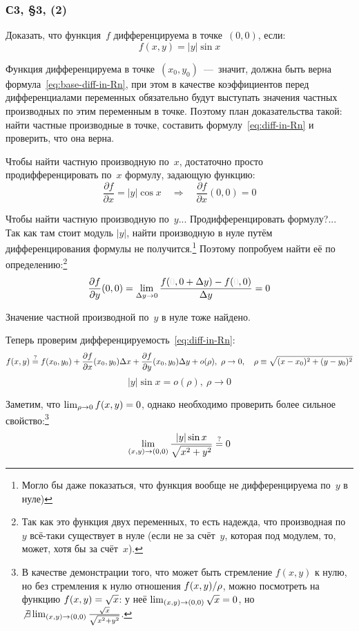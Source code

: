\documentclass[a4paper,12pt]{article}
\begin{document}
  \subsubsection{С3, \S 3, (2)}

  Доказать, что функция~$f$ дифференцируема в точке~$(0, 0)$, если:
  \[
    f(x, y) = |y| \sin x
  \]
  
  \begin{solution}
    Функция дифференцируема в точке~$(x_0, y_0)$~---~значит, должна быть верна формула~\eqref{eq:base-diff-in-Rn},
    при этом в качестве коэффициентов перед дифференциалами переменных обязательно будут выступать значения частных производных по этим переменным в точке.
    Поэтому план доказательства такой: найти частные производные в точке, составить формулу~\eqref{eq:diff-in-Rn} и проверить, что она верна.

    Чтобы найти частную производную по~$x$, достаточно просто продифференцировать по~$x$ формулу, задающую функцию:
    \[
      \frac{\partial f}{\partial x} = |y| \cos x \quad\Rightarrow\quad \frac{\partial f}{\partial x}(0, 0) = 0
    \]

    Чтобы найти частную производную по~$y$...
    Продифференцировать формулу?...
    Так как там стоит модуль $|y|$, найти производную в нуле путём дифференцирования формулы не получится.\footnote{
      Могло бы даже показаться, что функция вообще не дифференцируема по~$y$ в нуле)
    }
    Поэтому попробуем найти её по определению:\footnote{
      Так как это функция двух переменных, то есть надежда, что производная по~$y$ всё-таки существует в нуле (если не за счёт~$y$, которая под модулем, то, может, хотя бы за счёт~$x$).
    }
    \[
      \frac{\partial f}{\partial y}(0, 0) = \lim_{\Delta y \to 0} \frac{f(\textcolor{grey}{0}, 0 + \Delta y) - f(\textcolor{grey}{0}, 0)}{\Delta y} = 0
    \]

    Значение частной производной по~$y$ в нуле тоже найдено.

    Теперь проверим дифференцируемость~\eqref{eq:diff-in-Rn}:
    \[
      f(x, y) \overset{\operatorname{?}}{=} f(x_0, y_0) + \frac{\partial f}{\partial x}(x_0, y_0) \Delta x + \frac{\partial f}{\partial y}(x_0, y_0) \Delta y + o(\rho),\ \rho \to 0,\quad \rho \equiv \sqrt{(x - x_0)^2 + (y - y_0)^2}
    \]
    \[
      |y| \sin x = o(\rho),\ \rho \to 0
    \]

    Заметим, что $\lim_{\rho \to 0} f(x, y) \hm= 0$, однако необходимо проверить более сильное свойство:\footnote{
      В качестве демонстрации того, что может быть стремление $f(x, y)$ к нулю, но без стремления к нулю отношения $f(x, y) \hm/\rho $, можно посмотреть на функцию $f(x, y) \hm= \sqrt{x}$: у неё $\lim_{(x, y) \to (0, 0)} \sqrt{x} \hm= 0$, но $\not\exists \lim_{(x, y) \to (0, 0)} \frac{\sqrt{x}}{\sqrt{x^2 + y^2}}$.
    }
    \[
      \lim_{(x, y) \to (0, 0)} \frac{|y| \sin x}{\sqrt{x^2 + y^2}} \overset{\operatorname{?}}{=} 0
    \]


\end{solution}
\end{document}
